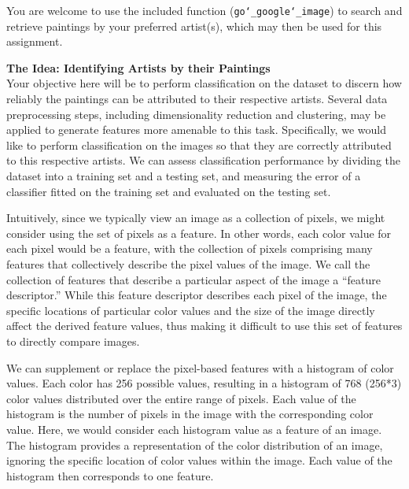 \documentclass[paper=a4, fontsize=11pt]{scrartcl} %
\numberwithin{equation}{section} %
\numberwithin{figure}{section} %
\numberwithin{table}{section} %
\begin{document}
You are welcome to use the included function (\texttt{go\char`_google\char`_image}) to search and retrieve paintings by your preferred artist(s), which may then be used for this assignment.

\vspace{8pt}

\textbf{The Idea:  Identifying Artists by their Paintings}\\
Your objective here will be to perform classification on the dataset to discern how reliably the paintings can be attributed to their respective artists. Several data preprocessing steps, including dimensionality reduction and clustering, may be applied to generate features more amenable to this task. Specifically, we would like to perform classification on the images so that they are correctly attributed to this respective artists. We can assess classification performance by dividing the dataset into a training set and a testing set, and measuring the error of a classifier fitted on the training set and evaluated on the testing set.

\vspace{6pt}

Intuitively, since we typically view an image as a collection of pixels, we might consider using the set of pixels as a feature. In other words, each color value for each pixel would be a feature, with the collection of pixels comprising many features that collectively describe the pixel values of the image. We call the collection of features that describe a particular aspect of the image a ``feature descriptor.'' While this feature descriptor describes each pixel of the image, the specific locations of particular color values and the size of the image directly affect the derived feature values, thus making it difficult to use this set of features to directly compare images.

\vspace{6pt}

We can supplement or replace the pixel-based features with a histogram of color values. Each color has 256 possible values, resulting in a histogram of 768 (256*3) color values distributed over the entire range of pixels. Each value of the histogram is the number of pixels in the image with the corresponding color value. Here, we would consider each histogram value as a feature of an image. The histogram provides a representation of the color distribution of an image, ignoring the specific location of color values within the image. Each value of the histogram then corresponds to one feature.
\end{document}
